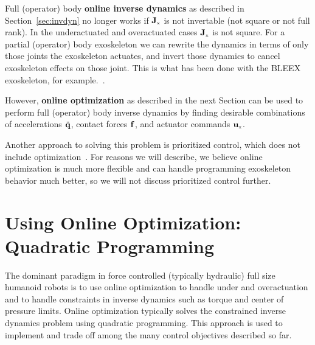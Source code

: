 \documentclass[letterpaper,12pt,fullpage]{article}
\newcommand{\myx}{{\mbox {\tiny x}}}
\begin{document}
Full (operator) body
{\bf online inverse dynamics} as described in Section~\ref{sec:invdyn}
no longer works if $\mJ_{\myx}$ is not invertable (not square or not full rank).
In the underactuated and overactuated cases $\mJ_{\myx}$ is not square. 
For a partial (operator) body
exoskeleton we can rewrite the dynamics in terms of only those
joints the exoskeleton actuates, and invert those dynamics to cancel exoskeleton
effects on those joint. This is what has been done with the BLEEX exoskeleton,
for example.~\cite{}.

However, {\bf online optimization}
as described in the next Section can be used to perform full (operator)
body inverse dynamics by
finding desirable combinations of accelerations $\ddot{{\bf q}}$, contact forces ${\bf f}$,
and actuator commands $\vu_{\myx}$.

Another approach to solving this problem is prioritized control, which does
not include optimization~\cite{}. For reasons we will describe, we believe
online optimization is much more flexible and can handle programming exoskeleton
behavior much better, so we will not discuss prioritized control further.

\section{Using Online Optimization: Quadratic Programming}
\label{sec:qp}

The dominant paradigm in force controlled (typically
hydraulic) full size humanoid robots is to use online optimization
to handle under and overactuation
and to handle constraints in inverse dynamics
such as torque and center of pressure limits.
Online optimization typically solves the constrained inverse dynamics problem
using quadratic programming.
This approach is used
to implement and trade off among the many control objectives described so far.
\end{document}
